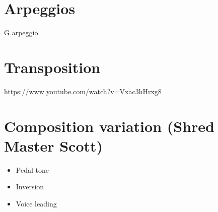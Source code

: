 \documentclass{article}
\begin{document}
\newpage
\section{Arpeggios}

\begin{table}[!h]
	\hspace*{-4cm}
	\scalebox{0.46}{}
	\hspace*{-1cm}
	\scalebox{0.46}{}

	\hspace*{-4cm}
	\scalebox{0.46}{}
	\hspace*{-1cm}
	\scalebox{0.46}{}

	\hspace*{-4cm}
	\scalebox{0.46}{}
	\hspace*{-1cm}
	\scalebox{0.46}{}

	\hspace*{-4cm}
	\scalebox{0.46}{}
	\hspace*{-1cm}

	\scalebox{0.46}{}
	\caption{G arpeggio}
	\label{fig:arpeggio}
\end{table}


\newpage
\section{Transposition}

https://www.youtube.com/watch?v=Vxac3hHrxg8




\newpage
\section{Composition variation (Shred Master Scott)}

\begin{itemize}
	\item Pedal tone
	\item Inversion
	\item Voice leading
\end{itemize}

%
%
\end{document}
